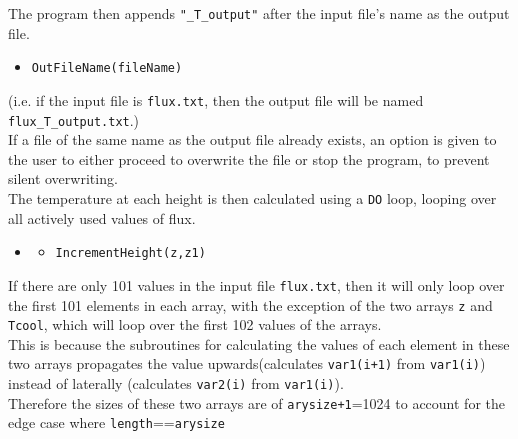 \documentclass[a4paper, 12pt]{article}
\begin{document}
The program then appends \texttt{"\_T\_output"} after the input file's name as the output file.
\begin{itemize}
	\item \texttt{\textcolor{func}{OutFileName}(fileName)} 
\end{itemize}
(i.e. if the input file is \texttt{flux.txt}, then the output file will be named \texttt{flux\_T\_output.txt}.) \\
If a file of the same name as the output file already exists, an option is given to the user to either proceed to overwrite the file or stop the program, to prevent silent overwriting.\\

The temperature at each height is then calculated using a \texttt{DO} loop, looping over all actively used values of flux.
\begin{itemize}
	\item[]
	\begin{itemize}
	\item \texttt{\textcolor{subr}{IncrementHeight}(z,z1)}
	\end  {itemize}
\end  {itemize}

If there are only 101 values in the input file \texttt{flux.txt}, then it will only loop over the first 101 elements in each array, with the exception of the two arrays \texttt{z} and \texttt{Tcool}, which will loop over the first 102 values of the arrays. \\
This is because the subroutines for calculating the values of each element in these two arrays propagates the value upwards(calculates \texttt{var1(i+1)} from \texttt{var1(i)}) instead of laterally (calculates \texttt{var2(i)} from \texttt{var1(i)}).\\
Therefore the sizes of these two arrays are of \texttt{arysize+1}=1024 to account for the edge case where \texttt{length}==\texttt{arysize}\\
\end{document}
